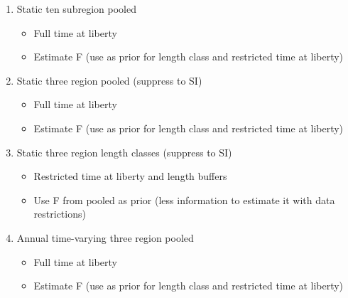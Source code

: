 \documentclass{article}
\begin{document}
\begin{enumerate}
    \item Static ten subregion pooled
    \begin{itemize}
        \item Full time at liberty
        \item Estimate F (use as prior for length class and restricted time at liberty)
    \end{itemize}
    \item Static three region pooled (suppress to SI)
    \begin{itemize}
        \item Full time at liberty
        \item Estimate F (use as prior for length class and restricted time at liberty)
    \end{itemize}    
    \item Static three region length classes (suppress to SI)
    \begin{itemize}
        \item Restricted time at liberty and length buffers
        \item Use F from pooled as prior (less information to estimate it with data restrictions)
    \end{itemize}
    \item Annual time-varying three region pooled
    \begin{itemize}
        \item Full time at liberty
        \item Estimate F (use as prior for length class and restricted time at liberty)
    \end{itemize} 

\end{enumerate}
\end{document}
